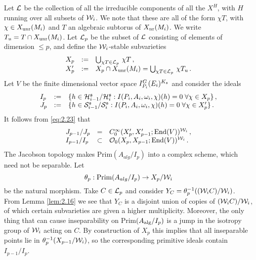 Let $\mathcal L$ be the collection of all the irreducible components of all the $X^H$, with $H$ 
running over all subsets of $\mathcal W_i$. We note that these are all of the form $\chi T$, 
with $\chi \in X_{\mathrm{unr}} (M_i )$ and $T$ an algebraic subtorus of $X_{\mathrm{nr}} (M_i )$. 
We write $T_u = T \cap X_{\mathrm{unr}} (M_i)$. Let $\mathcal L_p$ be the subset of $\mathcal L$ consisting
of elements of dimension $\leq p$, and define the $\mathcal W_i$-stable subvarieties
\[
\begin{array}{lll}
X_p & := & \bigcup_{\chi T \in \mathcal L_p} \, \chi T \,, \\
X'_p & := & X_p \cap X_{\mathrm{unr}} (M_i ) = 
\bigcup_{\chi T \in \mathcal L_p} \, \chi T_u \,.
\end{array}
\]
Let $V$ be the finite dimensional vector space $I^G_{P_i} (E_i )^{K_{\mathfrak s}}$ and
consider the ideals 
\[
\begin{array}{lll}
I_p & := & \{ h \in \mathcal H^{\mathfrak s}_{i-1} / \mathcal H^{\mathfrak s}_i : 
I(P_i ,A_i ,\omega_i ,\chi )(h) = 0 \; \forall \chi \in X_p \} \,, \\
J_p & := & \{ h \in \mathcal S^{\mathfrak s}_{i-1} / \mathcal S^{\mathfrak s}_i : 
I(P_i ,A_i ,\omega_i ,\chi )(h) = 0 \; \forall \chi \in X'_p \} \,.
\end{array}
\]
It follows from \eqref{eq:2.23} that 
\[
\begin{array}{lll}
J_{p-1} / J_p & = & C_0^\infty (X'_p , X'_{p-1} ; \mathrm{End}(V) )^{\mathcal W_i} \,, \\
I_{p-1} / I_p & \subset & \mathcal O_0 (X_p , X_{p-1} ; \mathrm{End}(V) )^{\mathcal W_i} \,.
\end{array}
\]
The Jacobson topology makes Prim$ (A_{alg} / I_p )$ into a complex scheme,
which need not be separable. Let 
\[
\theta_p : \mathrm{Prim}(A_{alg} / I_p ) \to X_p / \mathcal W_i
\]
be the natural morphism. Take $C \in \mathcal L_p$ and consider
$Y_C = \theta_p^{-1} ((\mathcal W_i C) / \mathcal W_i)$. From Lemma \ref{lem:2.16} we see that 
$Y_C$ is a disjoint union of copies of $(\mathcal W_i C) / \mathcal W_i $, of which certain subvarieties 
are given a higher multiplicity. Moreover, the only thing that can cause inseparability on
Prim$ (A_\mathrm{alg} / I_p )$ is a jump in the isotropy group of $\mathcal W_i$ acting on $C$. By construction
of $X_p$ this implies that all inseparable points lie in $\theta_p^{-1} (X_{p-1} / \mathcal W_i )$, 
so the corresponding primitive ideals contain $I_{p-1} / I_p$. 

